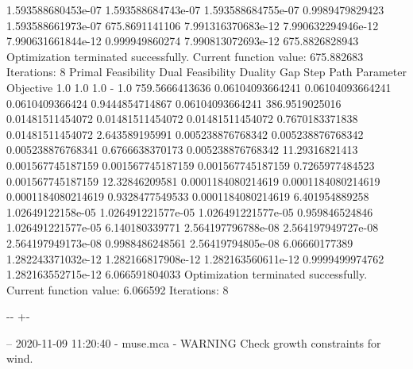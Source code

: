 \documentclass[letterpaper,10pt,english]{sphinxmanual}
\newlength\nbsphinxcodecellspacing
\begin{document}
{\begin{sphinxVerbatim}[commandchars=\\\{\}]
1.593588680453e-07  1.593588684743e-07  1.593588684755e-07  0.9989479829423  1.593588661973e-07  675.8691141106
7.991316370683e-12  7.990632294946e-12  7.990631661844e-12  0.999949860274   7.990813072693e-12  675.8826828943
Optimization terminated successfully.
         Current function value: 675.882683
         Iterations: 8
Primal Feasibility  Dual Feasibility    Duality Gap         Step             Path Parameter      Objective
1.0                 1.0                 1.0                 -                1.0                 759.5666413636
0.06104093664241    0.06104093664241    0.0610409366424     0.9444854714867  0.06104093664241    386.9519025016
0.01481511454072    0.01481511454072    0.01481511454072    0.7670183371838  0.01481511454072    2.643589195991
0.005238876768342   0.005238876768342   0.005238876768341   0.6766638370173  0.005238876768342   11.29316821413
0.001567745187159   0.001567745187159   0.001567745187159   0.7265977484523  0.001567745187159   12.32846209581
0.0001184080214619  0.0001184080214619  0.0001184080214619  0.9328477549533  0.0001184080214619  6.401954889258
1.02649122158e-05   1.026491221577e-05  1.026491221577e-05  0.959846524846   1.026491221577e-05  6.140180339771
2.564197796788e-08  2.564197949727e-08  2.564197949173e-08  0.9988486248561  2.56419794805e-08   6.06660177389
1.282243371032e-12  1.282166817908e-12  1.282163560611e-12  0.9999499974762  1.282163552715e-12  6.066591804033
Optimization terminated successfully.
         Current function value: 6.066592
         Iterations: 8
\end{sphinxVerbatim}
}

{

\kern-\sphinxverbatimsmallskipamount\kern-\baselineskip
\kern+\FrameHeightAdjust\kern-\fboxrule
\vspace{\nbsphinxcodecellspacing}

\begin{sphinxVerbatim}[commandchars=\\\{\}]
-- 2020-11-09 11:20:40 - muse.mca - WARNING
Check growth constraints for wind.

\end{sphinxVerbatim}
}
\end{document}
